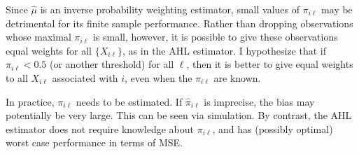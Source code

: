\documentclass[11pt]{amsart}
\begin{document}
Since $\hat{\mu}$ is an inverse probability weighting estimator, small values of $\pi_{i\ell}$ may be detrimental for its finite sample performance.  Rather than dropping observations whose maximal $\pi_{i\ell}$ is small, however, it is possible to give these observations equal weights for all $\{X_{i\ell}\}$, as in the AHL estimator.  I hypothesize that if $\pi_{i\ell} < 0.5$ (or another threshold) for all $\ell$, then it is better to give equal weights to all $X_{i\ell}$ associated with $i$, even when the $\pi_{i\ell}$ are known.

In practice, $\pi_{i\ell}$ needs to be estimated. If $\hat{\pi}_{i\ell}$ is imprecise, the bias may potentially be very large.  This can be seen via simulation.  By contrast, the AHL estimator does not require knowledge about $\pi_{i\ell}$, and has (possibly optimal) worst case performance in terms of MSE. 
\end{document}
